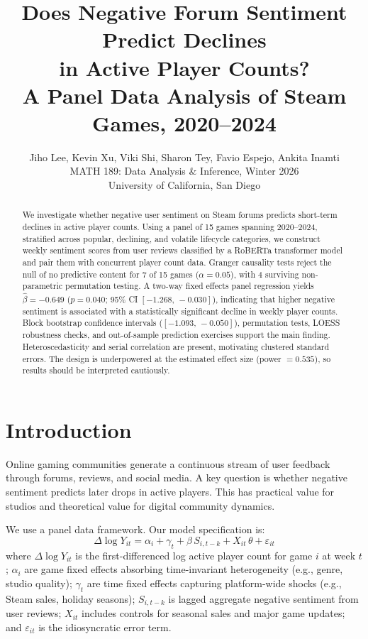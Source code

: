 \documentclass[11pt, letterpaper]{article}
\title{\textbf{Does Negative Forum Sentiment Predict Declines\\in Active Player Counts?}\\[0.5em]
\large A Panel Data Analysis of Steam Games, 2020--2024}
\author{Jiho Lee, Kevin Xu, Viki Shi, Sharon Tey, Favio Espejo, Ankita Inamti\\[0.3em]
\normalsize MATH 189: Data Analysis \& Inference, Winter 2026\\
\normalsize University of California, San Diego}
\date{}
\begin{document}
\maketitle
\thispagestyle{empty}

\begin{abstract}
\noindent
We investigate whether negative user sentiment on Steam forums predicts short-term declines in active player counts.
Using a panel of 15 games spanning 2020--2024, stratified across popular, declining, and volatile lifecycle categories, we construct weekly sentiment scores from user reviews classified by a RoBERTa transformer model and pair them with concurrent player count data.
Granger causality tests reject the null of no predictive content for 7 of 15 games ($\alpha = 0.05$), with 4 surviving non-parametric permutation testing.
A two-way fixed effects panel regression yields $\hat{\beta} = -0.649$ ($p = 0.040$; 95\% CI $[-1.268,\,-0.030]$), indicating that higher negative sentiment is associated with a statistically significant decline in weekly player counts.
Block bootstrap confidence intervals ($[-1.093,\,-0.050]$), permutation tests, LOESS robustness checks, and out-of-sample prediction exercises support the main finding.
Heteroscedasticity and serial correlation are present, motivating clustered standard errors.
The design is underpowered at the estimated effect size (power $= 0.535$), so results should be interpreted cautiously.
\end{abstract}

\tableofcontents
\newpage

\section{Introduction}\label{sec:intro}

Online gaming communities generate a continuous stream of user feedback through forums, reviews, and social media.
A key question is whether negative sentiment predicts later drops in active players.
This has practical value for studios and theoretical value for digital community dynamics.

We use a panel data framework.
Our model specification is:
\begin{equation}\label{eq:model}
    \Delta \log Y_{it} = \alpha_i + \gamma_t + \beta\, S_{i,t-k} + X_{it}\,\theta + \varepsilon_{it}
\end{equation}
where $\Delta \log Y_{it}$ is the first-differenced log active player count for game $i$ at week $t$; $\alpha_i$ are game fixed effects absorbing time-invariant heterogeneity (e.g., genre, studio quality); $\gamma_t$ are time fixed effects capturing platform-wide shocks (e.g., Steam sales, holiday seasons); $S_{i,t-k}$ is lagged aggregate negative sentiment from user reviews; $X_{it}$ includes controls for seasonal sales and major game updates; and $\varepsilon_{it}$ is the idiosyncratic error term.
\end{document}
